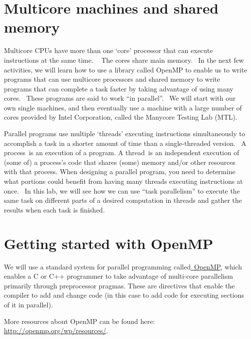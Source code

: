 \documentclass[letterpaper,10pt,openany,oneside]{sphinxmanual}
\begin{document}
\section{Multicore machines and shared memory}
\label{introOpenMP/GettingstartedwithOpenMP:multicore-machines-and-shared-memory}
Multicore CPUs have more than one ‘core’ processor that can execute
instructions at the same time.   The cores share main memory.  In the
next few activities, we will learn how to use a library called OpenMP to
enable us to write programs that can use multicore processors and shared
memory to write programs that can complete a task faster by taking
advantage of using many cores.  These programs are said to work “in
parallel”.  We will start with our own single machines, and then
eventually use a machine with a large number of cores provided by Intel
Corporation, called the Manycore Testing Lab (MTL).

Parallel programs use multiple ‘threads’ executing instructions
simultaneously to accomplish a task in a shorter amount of time than a
single-threaded version.  A process is an execution of a program. A
thread is an independent execution of (some of) a process's code that
shares (some) memory and/or other resources with that process. When
designing a parallel program, you need to determine what portions could
benefit from having many threads executing instructions at once.  In
this lab, we will see how we can use “task parallelism” to execute the
same task on different parts of a desired computation in threads and
gather the results when each task is finished.


\section{Getting started with OpenMP}
\label{introOpenMP/GettingstartedwithOpenMP:getting-started-with-openmp}
We will use a standard system for parallel programming
called\href{http://openmp.org/wp/}{ }\href{http://openmp.org/wp/}{OpenMP},
which enables a C or C++ programmer to take advantage of multi-core
parallelism primarily through preprocessor pragmas. These are directives
that enable the compiler to add and change code (in this case to add
code for executing sections of it in parallel).




More resources about OpenMP can be found here: \href{http://openmp.org/wp/resources/}{http://openmp.org/wp/resources/}.
\end{document}
